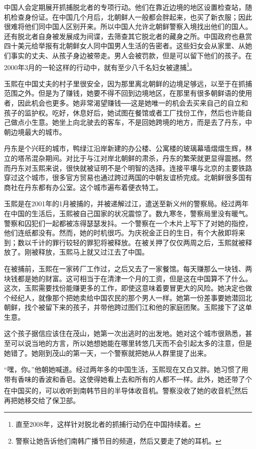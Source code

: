 中国人会定期展开抓捕脱北者的专项行动。他们在靠近边境的地区设置检查站，随机检查身份证。在中国几个月后，北朝鲜人一般都会胖起来，也买了新衣服；因此很难将他们同中国人区别开来。所以中国人允许北朝鲜警察入境找出他们的国人。还有脱北者自身被发展成为间谍，去筛查其它脱北者的藏身之所。中国政府也悬赏四十美元给举报有北朝鲜女人同中国男人生活的告密者。这些妇女会从家里、从她们事实的丈夫、从孩子身边被带走。男人会被罚款，但是可以留下他们的孩子。在2000年3月的一轮这样的行动中，就有至少八千名妇女被逮捕\footnote{直至2008年，这样针对脱北者的抓捕行动仍在中国持续着。}。

玉熙在中国丈夫的村子里很安全，因为那里离北朝鲜的边境足够远，以至于在抓捕范围之外。但是为了赚钱，她要不得不回到边境地区，在那里有很多朝鲜语的使用者，因此机会也更多。她非常渴望赚钱──这是她唯一的机会去买来自己的自立和孩子的监护权。吃好，休息好后，她试图在餐馆或者工厂找份工作，然后也许能自己做点小生意。她坐上向北驶去的客车，不是回她跨境的地方，而是去了丹东，中朝边境最大的城市。

丹东是个兴旺的城市，鸭绿江沿岸新建的办公楼、公寓楼的玻璃幕墙熠熠生辉，林立的塔吊混杂期间。对比于与江对岸北朝鲜的肃杀，丹东的繁荣就更显得震撼。然而丹东对玉熙来说，很快就被证明不是个明智的选择。连接平壤与北京的主要铁路穿过这个城市，很多官方贸易也通过跨过两国的中朝友谊桥完成。北朝鲜很多国有商社在丹东都有办公室。这个城市遍布着便衣特工。

玉熙是在2001年的1月被捕的，并被递解过江，遣送至新义州的警察局。经过两年在中国的生活后，玉熙被自己国家的状况震惊了。数九寒冬，警察局里没有暖气。警察和囚犯们一起都被冻得瑟瑟发抖。一个警察在一个木片上写下了对她的指控，他们连纸都没有。然而，她的时机很巧。为庆祝金正日的生日，有个大赦即将来到；数以千计的罪行较轻的罪犯将被释放。在被关押了仅仅两周之后，玉熙就被释放了。刚被释放，玉熙马上就又过江去了中国。

在被捕前，玉熙在一家砖厂工作过，之后又去了一家餐馆。每天赚那么一块钱、两块钱都是她的财富。这可相当于在清津一个月的工资，但是这在中国算不了什么。这次，玉熙需要找份能赚更多的工作，即使这意味着要冒更大的风险。她决定也做个经纪人，就像那个把她卖给中国农民的那个男人一样。她第一份差事要她潜回北朝鲜，找个被留下来的孩子，并带他跨过图们江和他的家庭团聚。玉熙接下了这单生意。

这个孩子据信应该住在茂山，她第一次出逃时的出发地。她对这个城市很熟悉，甚至可以说当地的方言，所以她想她能在哪里转悠几天而不会引起太多的注意，但是她错了。她刚到茂山的第一天，一个警察就把她从人群里提了出来。

“嘿，你。”他朝她喊道。经过两年多的中国生活，玉熙现在又白又胖。她习惯了用带有香味的香波和香皂。这使得她看上去和所有的人都不一样。此外，她还带了个在中国买的，可以收听到南韩节目的半导体收音机。警察没收了她的收音机\footnote{警察让她告诉他们南韩广播节目的频道，然后又要走了她的耳机。}然后再把她移交给了保卫部。

